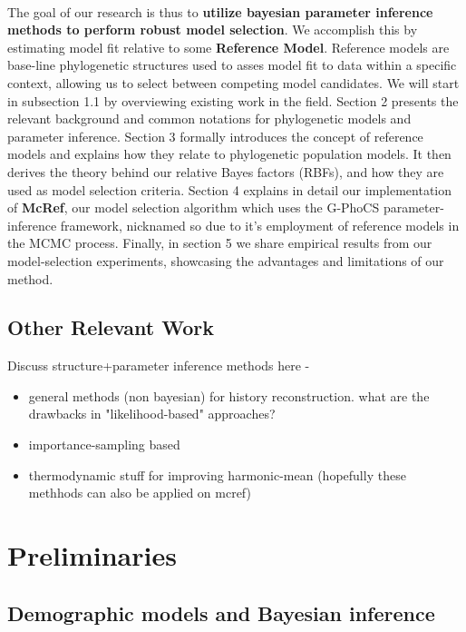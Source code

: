 \documentclass[11pt]{article}
\newcommand{\1}{\mathbbm{1}}
\newcommand{\gp}{G-PhoCS }
\begin{document}
%
\\
The goal of our research is thus to \textbf{utilize bayesian parameter inference methods to perform robust model selection}.
%
We accomplish this by estimating model fit relative to some \textbf{Reference Model}. Reference models are base-line phylogenetic structures used to asses model fit to data within a specific context, allowing us to select between competing model candidates.
%
We will start in subsection 1.1 by overviewing existing work in the field.
%
Section 2 presents the relevant background and common notations for phylogenetic models and parameter inference.
%
Section 3 formally introduces the concept of reference models and explains how they relate to phylogenetic population models. It then derives the theory behind our relative Bayes factors (RBFs), and how they are used as model selection criteria. 
%
Section 4 explains in detail our implementation of \textbf{McRef}, our model selection algorithm which uses the \gp parameter-inference framework, nicknamed so due to it's employment of reference models in the MCMC process.
%
Finally, in section 5 we share empirical results from our model-selection experiments, showcasing the advantages and limitations of our method.

\subsection{Other Relevant Work}

Discuss structure+parameter inference methods here - 

\begin{itemize}
\item general methods (non bayesian) for history reconstruction. what are the drawbacks in "likelihood-based" approaches?

\item importance-sampling based

\item thermodynamic stuff for improving harmonic-mean (hopefully these methhods can also be applied on mcref)

\end{itemize}

\section{Preliminaries}



\subsection{Demographic models and Bayesian inference}
\end{document}
